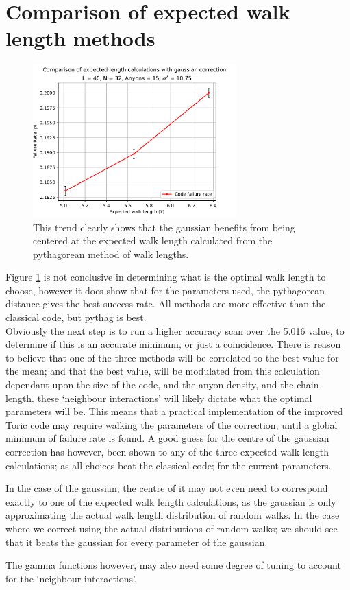 \section{Comparison of expected walk length methods}

\begin{figure}[htpb]
	\centering
	\includegraphics[width = 0.7\textwidth]{figs/comparison_of_methods}
	\caption{This trend clearly shows that the gaussian benefits from being centered at the expected walk length calculated from the pythagorean method of walk lengths. }
	\label{fig:methodcomparison}
\end{figure}
Figure \ref{fig:methodcomparison} is not conclusive in determining what is the optimal walk length to choose, however it does show that for the parameters used, the pythagorean distance gives the best success rate. All methods are more effective than the classical code, but pythag is best. \\
Obviously the next step is to run a higher accuracy scan over the 5.016 value, to determine if this is an accurate minimum, or just a coincidence. There is reason to believe that one of the three methods will be correlated to the best value for the mean; and that the best value, will be modulated from this calculation dependant upon the size of the code, and the anyon density, and the chain length. these `neighbour interactions' will likely dictate what the optimal parameters will be. This means that a practical implementation of the improved Toric code may require walking the parameters of the correction, until a global minimum of failure rate is found.  A good guess for the centre of the gaussian correction has however, been shown to any of the three expected walk length calculations; as all choices beat the classical code; for the current parameters. 

In the case of the gaussian, the centre of it may not even need to correspond exactly to one of the expected walk length calculations, as the gaussian is only approximating the actual walk length distribution of random walks. In the case where we correct using the actual distributions of random walks; we should see that it beats the gaussian for every parameter of the gaussian. 

The gamma functions however, may also need some degree of tuning to account for the `neighbour interactions'. 